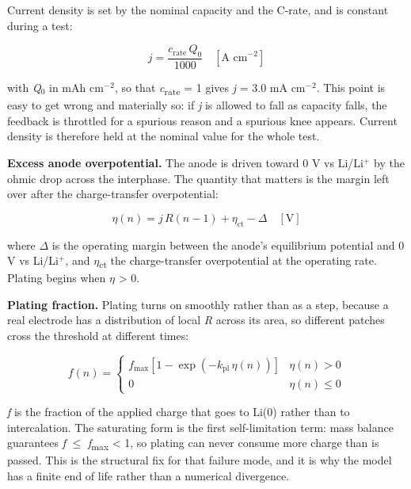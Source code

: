 \documentclass[11pt,a4paper]{article}
\begin{document}
Current density is set by the nominal capacity and the C-rate, and is constant during a test:


\begin{equation}j = \frac{c_{\text{rate}}\,Q_0}{1000}\quad[\text{A cm}^{-2}] \tag{S1.E1}\end{equation}


with \emph{Q}\ensuremath{_{0}} in mAh cm\ensuremath{^{-}}\ensuremath{^{2}}, so that \emph{c}\textsubscript{rate} = 1 gives \emph{j} = 3.0 mA cm\ensuremath{^{-}}\ensuremath{^{2}}. This point is easy to get wrong and materially so: if \emph{j} is allowed to fall as capacity falls, the feedback is throttled for a spurious reason and a spurious knee appears. Current density is therefore held at the nominal value for the whole test.


\textbf{Excess anode overpotential.} The anode is driven toward 0 V vs Li/Li\ensuremath{^{+}} by the ohmic drop across the interphase. The quantity that matters is the margin left over after the charge-transfer overpotential:


\begin{equation}\eta(n) = j\,R(n-1) + \eta_{\text{ct}} - \Delta \quad[\text{V}] \tag{S1.E2}\end{equation}


where \ensuremath{\Delta} is the operating margin between the anode's equilibrium potential and 0 V vs Li/Li\ensuremath{^{+}}, and \emph{\ensuremath{\eta}}\textsubscript{ct} the charge-transfer overpotential at the operating rate. Plating begins when \emph{\ensuremath{\eta}} > 0.


\textbf{Plating fraction.} Plating turns on smoothly rather than as a step, because a real electrode has a distribution of local \emph{R} across its area, so different patches cross the threshold at different times:


\begin{equation}f(n) = \begin{cases} f_{\max}\left[1-\exp\left(-k_{\text{pl}}\,\eta(n)\right)\right] & \eta(n) > 0\\[2pt] 0 & \eta(n) \le 0\end{cases} \tag{S1.E3}\end{equation}


\emph{f} is the fraction of the applied charge that goes to Li(0) rather than to intercalation. The saturating form is the first self-limitation term: mass balance guarantees \emph{f} \ensuremath{\leq} \emph{f}\textsubscript{max} < 1, so plating can never consume more charge than is passed. This is the structural fix for that failure mode, and it is why the model has a finite end of life rather than a numerical divergence.
\end{document}
